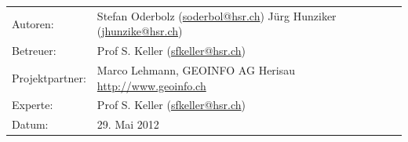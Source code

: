\begin{titlepage}
\begin{flushleft}
\begin{tabular}{lp{12cm}}
Autoren: & Stefan Oderbolz (\url{soderbol@hsr.ch}) \newline
 Jürg Hunziker (\url{jhunzike@hsr.ch}) \\ 
Betreuer: & Prof S. Keller (\url{sfkeller@hsr.ch}) \\ 
Projektpartner: & Marco Lehmann, GEOINFO AG Herisau \url{http://www.geoinfo.ch} \\ 
Experte: & Prof S. Keller (\url{sfkeller@hsr.ch}) \\ 
Datum: & 29. Mai 2012 \\ 
\end{tabular}

\end{flushleft}
\end{titlepage}
